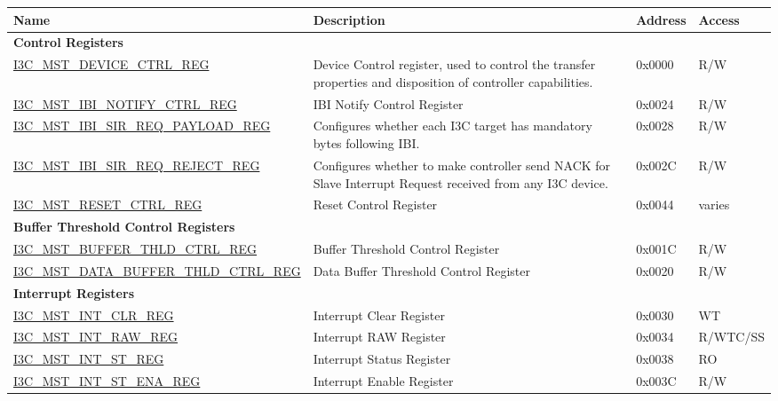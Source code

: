 \begin{longtable}{ | p{7.5cm} | p{6cm} | p{1.3cm} | p{1.5cm} | }
\hline\rowcolor{lightgray}
\textbf{Name} & \textbf{Description} &  \textbf{Address} & \textbf{Access} \\ \hline
\endhead
\multicolumn{4}{|l|}{\textbf{Control Registers}} \\ \hline
\hyperref[regdesc:I3CMSTDEVICECTRLREG]{I3C\_MST\_DEVICE\_CTRL\_REG} & Device Control register, used to control the transfer properties and disposition of controller capabilities. & 0x0000 & R/W \\ \hline
\hyperref[regdesc:I3CMSTIBINOTIFYCTRLREG]{I3C\_MST\_IBI\_NOTIFY\_CTRL\_REG} & IBI Notify Control Register & 0x0024 & R/W \\ \hline
\hyperref[regdesc:I3CMSTIBISIRREQPAYLOADREG]{I3C\_MST\_IBI\_SIR\_REQ\_PAYLOAD\_REG} & Configures whether each I3C target has mandatory bytes following IBI. & 0x0028 & R/W \\ \hline
\hyperref[regdesc:I3CMSTIBISIRREQREJECTREG]{I3C\_MST\_IBI\_SIR\_REQ\_REJECT\_REG} & Configures whether to make controller send NACK for Slave Interrupt Request received from any I3C device. & 0x002C & R/W \\ \hline
\hyperref[regdesc:I3CMSTRESETCTRLREG]{I3C\_MST\_RESET\_CTRL\_REG} & Reset Control Register & 0x0044 & varies \\ \hline
\multicolumn{4}{|l|}{\textbf{Buffer Threshold Control Registers}} \\ \hline
\hyperref[regdesc:I3CMSTBUFFERTHLDCTRLREG]{I3C\_MST\_BUFFER\_THLD\_CTRL\_REG} & Buffer Threshold Control Register & 0x001C & R/W \\ \hline
\hyperref[regdesc:I3CMSTDATABUFFERTHLDCTRLREG]{I3C\_MST\_DATA\_BUFFER\_THLD\_CTRL\_REG} & Data Buffer Threshold Control Register & 0x0020 & R/W \\ \hline
\multicolumn{4}{|l|}{\textbf{Interrupt Registers}} \\ \hline
\hyperref[regdesc:I3CMSTINTCLRREG]{I3C\_MST\_INT\_CLR\_REG} & Interrupt Clear Register & 0x0030 & WT \\ \hline
\hyperref[regdesc:I3CMSTINTRAWREG]{I3C\_MST\_INT\_RAW\_REG} & Interrupt RAW Register & 0x0034 & R/WTC/SS \\ \hline
\hyperref[regdesc:I3CMSTINTSTREG]{I3C\_MST\_INT\_ST\_REG} & Interrupt Status Register & 0x0038 & RO \\ \hline
\hyperref[regdesc:I3CMSTINTSTENAREG]{I3C\_MST\_INT\_ST\_ENA\_REG} & Interrupt Enable Register & 0x003C & R/W \\ \hline

\end{longtable}
